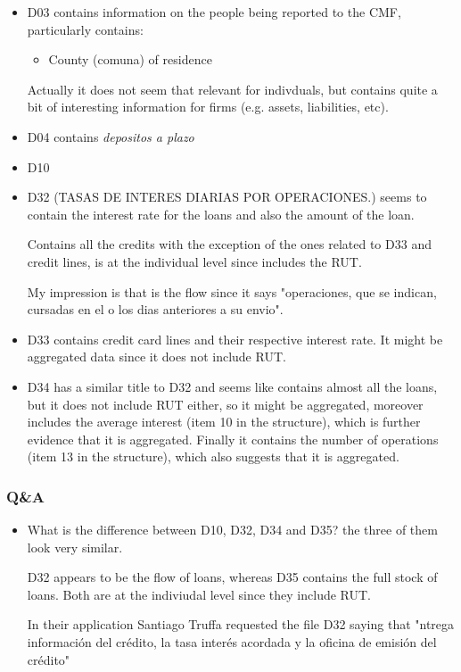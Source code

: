 \documentclass[12pt]{article}
\theoremstyle{plain}
\theoremstyle{plain}
\theoremstyle{definition}  %
\theoremstyle{remark}  %
\begin{document}
\begin{itemize}
    \item D03 contains information on the people being reported to the CMF, particularly contains: 
\begin{itemize}
    \item County (comuna) of residence
\end{itemize}
Actually it does not seem that relevant for indivduals, but contains quite a bit of interesting information for firms (e.g. assets, liabilities, etc).

\item D04 contains \textit{depositos a plazo}

\item D10 

\item D32 (TASAS DE INTERES DIARIAS POR OPERACIONES.) seems to contain the interest rate for the loans and also the amount of the loan.

Contains all the credits with the exception of the ones related to D33 and credit lines, is at the individual level since includes the RUT. 

My impression is that is the flow since it says "operaciones, que se indican, cursadas en el o los dias anteriores a su envio".

\item D33 contains credit card lines and their respective interest rate. It might be aggregated data since it does not include RUT.

\item D34 has a similar title to D32 and seems like contains almost all the loans, but it does not include RUT either, so it might be aggregated, moreover includes the average interest (item 10 in the structure), which is further evidence that it is aggregated. Finally it contains the number of operations (item 13 in the structure), which also suggests that it is aggregated.

\end{itemize}



\subsubsection{Q\&A}
\begin{itemize}
    \item What is the difference between D10, D32, D34 and D35? the three of them look very similar. 
    
    D32 appears to be the flow of loans, whereas D35 contains the full stock of loans. Both are at the indiviudal level since they include RUT.

    In their application Santiago Truffa requested the file D32 saying that "ntrega información del crédito, la tasa interés acordada y la oficina de emisión del crédito" 


\end{itemize}
\end{document}
